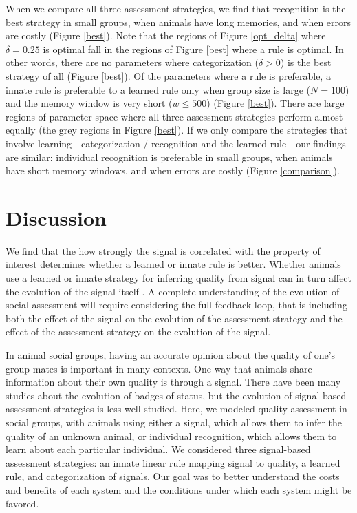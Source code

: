 When we compare all three assessment strategies, we find that recognition is the best strategy in small groups, when animals have long memories, and when errors are costly (Figure \ref{best}). Note that the regions of Figure \ref{opt_delta} where $\delta=0.25$ is optimal fall in the regions of Figure \ref{best} where a rule is optimal. In other words, there are no parameters where categorization ($\delta>0$) is the best strategy of all (Figure \ref{best}).  Of the parameters where a rule is preferable, a innate rule is preferable to a learned rule only when group size is large ($N=100$) and the memory window is very short ($w\leq500$) (Figure \ref{best}). There are large regions of parameter space where all three assessment strategies perform almost equally (the grey regions in Figure \ref{best}). If we only compare the strategies that involve learning---categorization / recognition and the learned rule---our findings are similar: individual recognition is preferable in small groups, when animals have short memory windows, and when errors are costly (Figure \ref{comparison}).

\section*{Discussion}
We find that the how strongly the signal is correlated with the property of interest determines whether a learned or innate rule is better. Whether animals use a learned or innate strategy for inferring quality from signal can in turn affect the evolution of the signal itself \citep{Kamo:2002vi}. A complete understanding of the evolution of social assessment will require considering the full feedback loop, that is including both the effect of the signal on the evolution of the assessment strategy and the effect of the assessment strategy on the evolution of the signal.


In animal social groups, having an accurate opinion about the quality of one's group mates is important in many contexts. One way that animals share information about their own quality is through a signal. There have been many studies about the evolution of badges of status, but the evolution of signal-based assessment strategies is less well studied. Here, we modeled quality assessment in social groups, with animals using either a signal, which allows them to infer the quality of an unknown animal, or individual recognition, which allows them to learn about each particular individual. We considered three signal-based assessment strategies: an innate linear rule mapping signal to quality, a learned rule, and categorization of signals. Our goal was to better understand the costs and benefits of each system and the conditions under which each system might be favored. 

